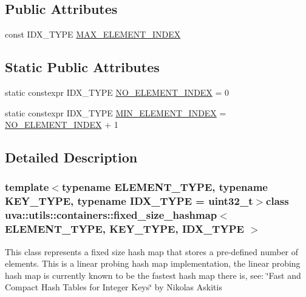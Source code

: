 \subsection*{Public Attributes}
\begin{DoxyCompactItemize}
\item 
const I\+D\+X\+\_\+\+T\+Y\+P\+E \hyperlink{classuva_1_1utils_1_1containers_1_1fixed__size__hashmap_a818dfd25ffa4910828404c61df3f6522}{M\+A\+X\+\_\+\+E\+L\+E\+M\+E\+N\+T\+\_\+\+I\+N\+D\+E\+X}
\end{DoxyCompactItemize}
\subsection*{Static Public Attributes}
\begin{DoxyCompactItemize}
\item 
static constexpr I\+D\+X\+\_\+\+T\+Y\+P\+E \hyperlink{classuva_1_1utils_1_1containers_1_1fixed__size__hashmap_acd50115f076ea8726089a1cf8526527d}{N\+O\+\_\+\+E\+L\+E\+M\+E\+N\+T\+\_\+\+I\+N\+D\+E\+X} = 0
\item 
static constexpr I\+D\+X\+\_\+\+T\+Y\+P\+E \hyperlink{classuva_1_1utils_1_1containers_1_1fixed__size__hashmap_a686413e07e62479494d180da1e0ad73c}{M\+I\+N\+\_\+\+E\+L\+E\+M\+E\+N\+T\+\_\+\+I\+N\+D\+E\+X} = \hyperlink{classuva_1_1utils_1_1containers_1_1fixed__size__hashmap_acd50115f076ea8726089a1cf8526527d}{N\+O\+\_\+\+E\+L\+E\+M\+E\+N\+T\+\_\+\+I\+N\+D\+E\+X} + 1
\end{DoxyCompactItemize}


\subsection{Detailed Description}
\subsubsection*{template$<$typename E\+L\+E\+M\+E\+N\+T\+\_\+\+T\+Y\+P\+E, typename K\+E\+Y\+\_\+\+T\+Y\+P\+E, typename I\+D\+X\+\_\+\+T\+Y\+P\+E = uint32\+\_\+t$>$class uva\+::utils\+::containers\+::fixed\+\_\+size\+\_\+hashmap$<$ E\+L\+E\+M\+E\+N\+T\+\_\+\+T\+Y\+P\+E, K\+E\+Y\+\_\+\+T\+Y\+P\+E, I\+D\+X\+\_\+\+T\+Y\+P\+E $>$}

This class represents a fixed size hash map that stores a pre-\/defined number of elements. This is a linear probing hash map implementation, the linear probing hash map is currently known to be the fastest hash map there is, see\+: \char`\"{}\+Fast and Compact Hash Tables for Integer Keys\char`\"{} by Nikolas Askitis


